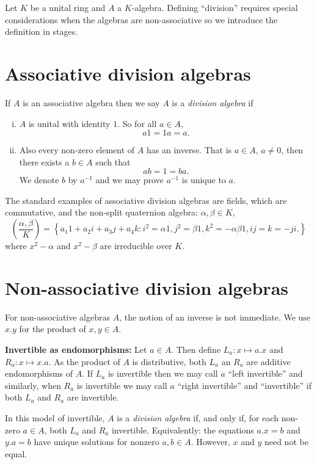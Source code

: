 \documentclass[12pt]{article}
\begin{document}
Let $K$ be a unital ring and $A$ a $K$-algebra.  Defining ``division''
requires special considerations when the algebras are non-associative
so we introduce the definition in stages.

\section{Associative division algebras}

If $A$ is an 
associative algebra then we say $A$ is a \emph{division algebra}
if
\begin{enumerate}[(i)]
\item $A$ is unital with identity $1$.  So for all $a\in A$,
\[a1=1a=a.\]
\item Also every non-zero element of $A$ has an inverse.  That is
$a\in A$, $a\neq 0$, then there exists a $b\in A$ such that
\[ab=1=ba.\]
We denote $b$ by $a^{-1}$ and we may prove $a^{-1}$ is unique to $a$.
\end{enumerate}

The standard examples of associative division algebras are fields, which
are commutative, and the non-split quaternion algebra: $\alpha,\beta\in K$,
\[\left(\frac{\alpha,\beta}{K}\right)=\left\{
a_1 1+a_2 i+a_3 j+a_4 k : i^2=\alpha 1, j^2=\beta 1, k^2=-\alpha \beta 1, ij=k=-ji.\right\}\]
where $x^2-\alpha$ and $x^2-\beta$ are irreducible over $K$.

\section{Non-associative division algebras}

For non-associative algebras $A$, the notion of an inverse is not immediate.
We use $x.y$ for the product of $x,y\in A$.

\textbf{Invertible as endomorphisms:}  Let $a\in A$.  Then define $L_a:x\mapsto a.x$
and $R_a:x\mapsto x.a$.  As the product of $A$ is distributive, both $L_a$ an $R_a$
are additive endomorphisms of $A$.  If $L_a$ is invertible then we may call $a$
``left invertible'' and similarly, when $R_a$ is invertible we may call $a$
``right invertible'' and ``invertible'' if both $L_a$ and $R_a$ are invertible.

In this model of invertible, $A$ is a \emph{division algebra} if, and only if,
for each non-zero $a\in A$, both $L_a$ and $R_a$ invertible.
Equivalently: the equations $a.x=b$ and $y.a=b$ have unique solutions
for nonzero $a,b\in A$.  However, $x$ and $y$ need not be equal.
\end{document}
